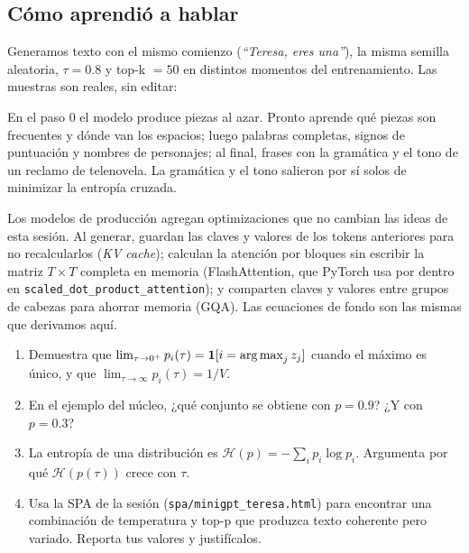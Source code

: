 \documentclass[11pt,letterpaper,oneside]{report}
\begin{document}
\subsection{Cómo aprendió a hablar}

Generamos texto con el mismo comienzo (\emph{``Teresa, eres una''}), la misma semilla aleatoria, $\tau = 0.8$ y top-k $= 50$ en distintos momentos del entrenamiento. Las muestras son reales, sin editar:



En el paso 0 el modelo produce piezas al azar. Pronto aprende qué piezas son frecuentes y dónde van los espacios; luego palabras completas, signos de puntuación y nombres de personajes; al final, frases con la gramática y el tono de un reclamo de telenovela. La gramática y el tono salieron por sí solos de minimizar la entropía cruzada.

\begin{nota}
Los modelos de producción agregan optimizaciones que no cambian las ideas de esta sesión. Al generar, guardan las claves y valores de los tokens anteriores para no recalcularlos (\emph{KV cache}); calculan la atención por bloques sin escribir la matriz $T\times T$ completa en memoria (FlashAttention, que PyTorch usa por dentro en \texttt{scaled\_dot\_product\_attention}); y comparten claves y valores entre grupos de cabezas para ahorrar memoria (GQA). Las ecuaciones de fondo son las mismas que derivamos aquí.
\end{nota}

\begin{ejercicio}
\begin{enumerate}[label=\alph*)]
  \item Demuestra que $\lim_{\tau\to 0^+} p_i(\tau) = \mathbf{1}[i = \operatorname*{arg\,max}_j z_j]$ cuando el máximo es único, y que $\lim_{\tau\to\infty} p_i(\tau) = 1/V$.
  \item En el ejemplo del núcleo, ¿qué conjunto se obtiene con $p = 0.9$? ¿Y con $p = 0.3$?
  \item La entropía de una distribución es $\mathcal{H}(p) = -\sum_i p_i\log p_i$. Argumenta por qué $\mathcal{H}(p(\tau))$ crece con $\tau$.
  \item Usa la SPA de la sesión (\texttt{spa/minigpt\_teresa.html}) para encontrar una combinación de temperatura y top-p que produzca texto coherente pero variado. Reporta tus valores y justifícalos.
\end{enumerate}
\end{ejercicio}
\end{document}
